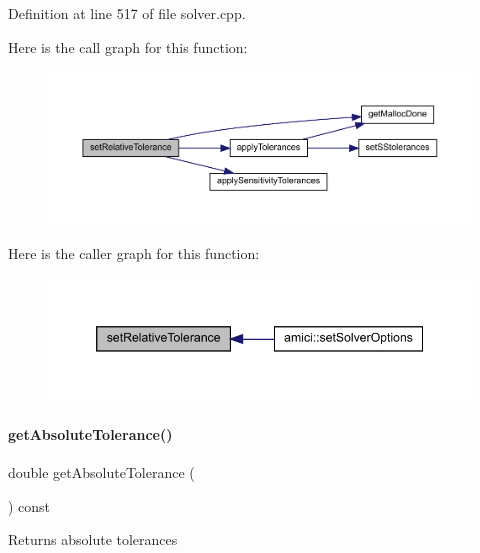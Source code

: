Definition at line 517 of file solver.\+cpp.

Here is the call graph for this function\+:
\nopagebreak
\begin{figure}[H]
\begin{center}
\leavevmode
\includegraphics[width=350pt]{classamici_1_1_solver_afb5f0c48f24e4bc3efad8ef599adde56_cgraph}
\end{center}
\end{figure}
Here is the caller graph for this function\+:
\nopagebreak
\begin{figure}[H]
\begin{center}
\leavevmode
\includegraphics[width=346pt]{classamici_1_1_solver_afb5f0c48f24e4bc3efad8ef599adde56_icgraph}
\end{center}
\end{figure}
\mbox{\label{classamici_1_1_solver_a676df944b6737474dd4ef74fe9212f3e}} 
\paragraph{\texorpdfstring{get\+Absolute\+Tolerance()}{getAbsoluteTolerance()}}
{\footnotesize\ttfamily double get\+Absolute\+Tolerance (\begin{DoxyParamCaption}{ }\end{DoxyParamCaption}) const}

\begin{DoxyReturn}{Returns}
absolute tolerances 
\end{DoxyReturn}


